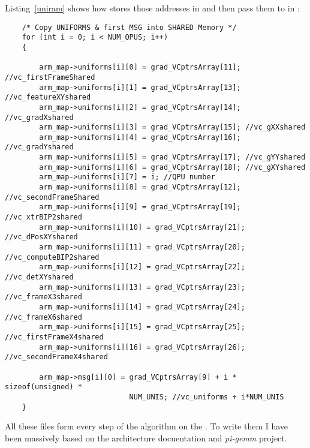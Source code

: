 Listing~\ref{uniram} shows how \cpu{} stores those addresses in \ram{} and then pass them to \vc{} in :
\begin{lstlisting}
    /* Copy UNIFORMS & first MSG into SHARED Memory */
    for (int i = 0; i < NUM_QPUS; i++)
    {

        arm_map->uniforms[i][0] = grad_VCptrsArray[11]; //vc_firstFrameShared
        arm_map->uniforms[i][1] = grad_VCptrsArray[13]; //vc_featureXYshared
        arm_map->uniforms[i][2] = grad_VCptrsArray[14]; //vc_gradXshared
        arm_map->uniforms[i][3] = grad_VCptrsArray[15]; //vc_gXXshared
        arm_map->uniforms[i][4] = grad_VCptrsArray[16]; //vc_gradYshared
        arm_map->uniforms[i][5] = grad_VCptrsArray[17]; //vc_gYYshared
        arm_map->uniforms[i][6] = grad_VCptrsArray[18]; //vc_gXYshared
        arm_map->uniforms[i][7] = i; //QPU number
        arm_map->uniforms[i][8] = grad_VCptrsArray[12]; //vc_secondFrameShared
        arm_map->uniforms[i][9] = grad_VCptrsArray[19]; //vc_xtrBIP2shared
        arm_map->uniforms[i][10] = grad_VCptrsArray[21]; //vc_dPosXYshared
        arm_map->uniforms[i][11] = grad_VCptrsArray[20]; //vc_computeBIP2shared
        arm_map->uniforms[i][12] = grad_VCptrsArray[22]; //vc_detXYshared
        arm_map->uniforms[i][13] = grad_VCptrsArray[23]; //vc_frameX3shared
        arm_map->uniforms[i][14] = grad_VCptrsArray[24]; //vc_frameX6shared
        arm_map->uniforms[i][15] = grad_VCptrsArray[25]; //vc_firstFrameX4shared
        arm_map->uniforms[i][16] = grad_VCptrsArray[26]; //vc_secondFrameX4shared

        arm_map->msg[i][0] = grad_VCptrsArray[9] + i * sizeof(unsigned) *
                             NUM_UNIS; //vc_uniforms + i*NUM_UNIS
    }
\end{lstlisting}


All these  files form every step of the \flow{} algorithm on the \vc{}. To write them I have been massively based on the \vc{} architecture docuentation \parencite{refVC} and \emph{pi-gemm} project.
